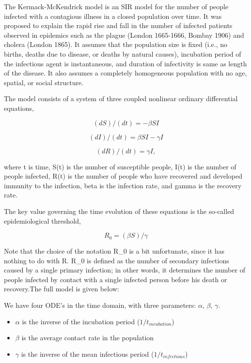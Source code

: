 \documentclass{article}\usepackage[]{graphicx}\usepackage[]{color}
\begin{document}
The Kermack-McKendrick model is an SIR model for the number of people infected with a contagious illness in a closed population over time. It was proposed to explain the rapid rise and fall in the number of infected patients observed in epidemics such as the plague (London 1665-1666, Bombay 1906) and cholera (London 1865). It assumes that the population size is fixed (i.e., no births, deaths due to disease, or deaths by natural causes), incubation period of the infectious agent is instantaneous, and duration of infectivity is same as length of the disease. It also assumes a completely homogeneous population with no age, spatial, or social structure.

The model consists of a system of three coupled nonlinear ordinary differential equations,


\begin{equation}
(dS)/(dt)	=	-\beta SI	
\end{equation}

\begin{equation}
(dI)/(dt)	=	\beta SI- \gamma I
\end{equation}

\begin{equation}
(dR)/(dt)	=	\gamma I,
\end{equation}

where t is time, S(t) is the number of susceptible people, I(t) is the number of people infected, R(t) is the number of people who have recovered and developed immunity to the infection, beta is the infection rate, and gamma is the recovery rate.

The key value governing the time evolution of these equations is the so-called epidemiological threshold,

\begin{equation}
 R_0=(\beta S)/ \gamma
\end{equation}
 
Note that the choice of the notation R\_0 is a bit unfortunate, since it has nothing to do with R. R\_0 is defined as the number of secondary infections caused by a single primary infection; in other words, it determines the number of people infected by contact with a single infected person before his death or recovery.The full model is given below:

We have four ODE's in the time domain, with three parameters: $\alpha$, $\beta$, $\gamma$.

\begin{itemize}

\item $\alpha$ is the inverse of the incubation period ($1/t_{incubation}$)
\item $\beta$ is the average contact rate in the population
\item $\gamma$ is the inverse of the mean infectious period ($1/t_{infectious}$)

\end{itemize}
\end{document}
